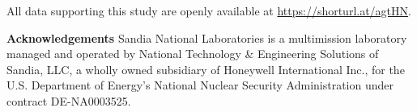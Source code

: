 \documentclass[runningheads]{llncs}
\begin{document}









\vspace{6 pt}
\begin{scriptsize}
	
	\par
	\noindent
	All data supporting this study are openly available at
	\url{https://shorturl.at/agtHN}.\\ 
    \label{public-data}

	\par
	\noindent
	\textbf{Acknowledgements} Sandia National Laboratories is a multimission laboratory managed and operated by National Technology \& Engineering Solutions of Sandia, LLC, a wholly owned subsidiary of Honeywell International Inc., for the U.S. Department of Energy’s National Nuclear Security Administration under contract DE-NA0003525.
	
\end{scriptsize}



\end{document}
